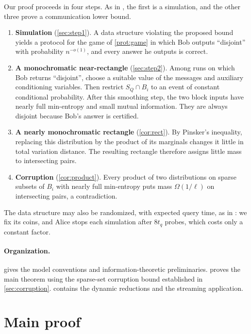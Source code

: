 \documentclass[11pt]{article}
\theoremstyle{plain}
\theoremstyle{definition}
\theoremstyle{remark}
\begin{document}
Our proof proceeds in four steps. As in \cite{ko_omega_2026}, the first is a simulation, and the other three prove a communication lower bound.
\begin{enumerate}[leftmargin=*]
  \item \textbf{Simulation} (\cref{sec:step1}). A data structure violating the proposed bound yields a protocol for the game of \cref{prot:game} in which Bob outputs ``disjoint'' with probability $n^{-o(1)}$, and every answer he outputs is correct.
  \item \textbf{A monochromatic near-rectangle} (\cref{sec:step2}). Among runs on which Bob returns ``disjoint'', choose a suitable value of the messages and auxiliary conditioning variables. Then restrict $S_Q\cap B_i$ to an event of constant conditional probability. After this smoothing step, the two block inputs have nearly full min-entropy and small mutual information. They are always disjoint because Bob's answer is certified.
  \item \textbf{A nearly monochromatic rectangle} (\cref{cor:rect}). By Pinsker's inequality, replacing this distribution by the product of its marginals changes it little in total variation distance. The resulting rectangle therefore assigns little mass to intersecting pairs.
  \item \textbf{Corruption} (\cref{cor:product}). Every product of two distributions on sparse subsets of $B_i$ with nearly full min-entropy puts mass $\Omega(1/\ell)$ on intersecting pairs, a contradiction.
\end{enumerate}
The data structure may also be randomized, with expected query time, as in \cite{larsen_super-logarithmic_2025}: we fix its coins, and Alice stops each simulation after $8 t_q$ probes, which costs only a constant factor.

\paragraph{Organization.}
 gives the model conventions and information-theoretic preliminaries.  proves the main theorem using the sparse-set corruption bound established in \cref{sec:corruption}.  contains the dynamic reductions and the streaming application.



\section{Main proof}\label{sec:proof-main}
\end{document}
